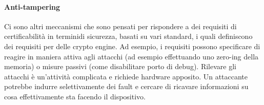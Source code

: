 \documentclass{article}
\begin{document}
\paragraph{Anti-tampering}
Ci sono altri meccanismi che sono pensati per rispondere a dei requisiti di certificabilità in terminidi sicurezza, basati su vari standard, i quali definiscono dei requisiti per delle crypto engine. Ad esempio, i requisiti possono specificare di reagire in maniera attiva agli attacchi (ad esempio effettuando uno zero-ing della memoria) o misure passivi (come disabilitare porto di debug). Rilevare gli attacchi è un'attività complicata e richiede hardware apposito. Un attaccante potrebbe indurre selettivamente dei fault e cercare di ricavare informazioni su cosa effettivamente sta facendo il dispositivo. 
\end{document}
